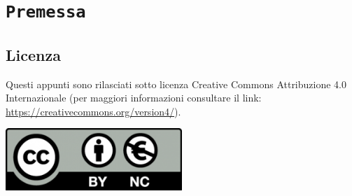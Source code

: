 \chapter*{\centering \texttt{Premessa}}

\section*{Licenza}

Questi appunti sono rilasciati sotto licenza Creative Commons Attribuzione 4.0 Internazionale (per maggiori
informazioni consultare il link: \href{https://creativecommons.org/version4/}{https://creativecommons.org/version4/}).
\begin{center}
    \includegraphics[width=0.5\textwidth]{images/cc_nc.png}
\end{center}










